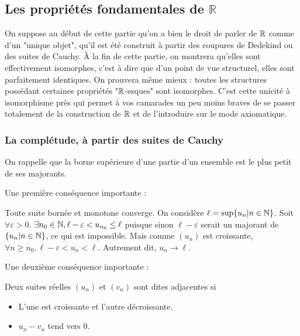 \begin{defini}[Multiplication]
    
\end{defini}

\subsection{Les propriétés fondamentales de $\mathbb{R}$}
On suppose au début de cette partie qu'on a bien le droit de parler de $\mathbb{R}$ comme d'un "unique objet", qu'il est été construit à partir des coupures de Dedekind ou des suites de Cauchy. À la fin de cette partie, on montrera qu'elles sont effectivement isomorphes, c'est à dire que d'un point de vue structurel, elles sont parfaitement identiques. On prouvera même mieux : toutes les structures possédant certaines propriétés "$\mathbb{R}$-esques" sont isomorphes. C'est cette unicité à isomorphisme près qui permet à vos camarades un peu moins braves de se passer totalement de la construction de $\mathbb{R}$ et de l'introduire sur le mode axiomatique.

\subsubsection{La complétude, à partir des suites de Cauchy}

On rappelle que la borne supérieure d'une partie d'un ensemble est le plus petit de ses majorants.

\begin{prop}
    
\end{prop}

Une première conséquence importante :

\begin{theoreme} \label{limmono}
    Toute suite bornée et monotone converge.
    \tcblower
    On considère $\ell=\sup\{u_n|n\in \mathbb{N}\}$. Soit $\forall\varepsilon > 0$. $\exists n_0 \in \mathbb{N}, \ell-\varepsilon<u_{n_0}\leq \ell$ puisque sinon $\ell-\varepsilon$ serait un majorant de $\{u_n|n\in \mathbb{N}\}$, ce qui est impossible. Mais comme $(u_n)$ est croissante, $\forall n \geq n_0, \ell-\varepsilon < u_n < \ell$. Autrement dit, $u_n \to \ell$.
\end{theoreme}

Une deuxième conséquence importante :

\begin{defini}
    Deux suites réelles $(u_n)$ et $(v_n)$ sont dites adjacentes si
    \begin{itemize}
        \item L'une est croissante et l'autre décroissante.
        \item $u_n-v_n$ tend vers 0.
    \end{itemize}
\end{defini}

